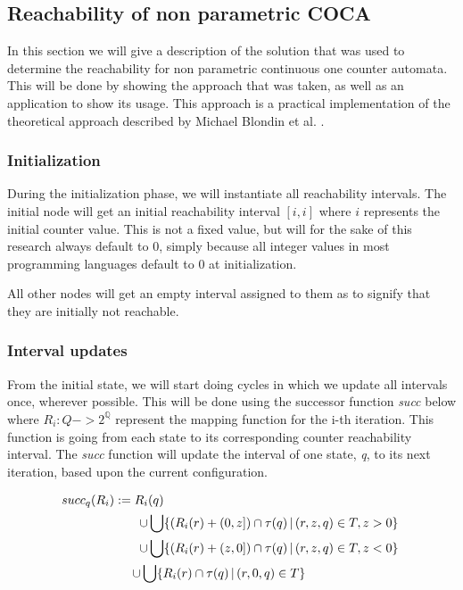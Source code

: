\documentclass[12pt]{article}
\begin{document}
\subsection{Reachability of non parametric COCA}
In this section we will give a description of the solution that was used to determine the reachability for non parametric continuous one counter automata. This will be done by showing the approach that was taken, as well as an application to show its usage. This approach is a practical implementation of the theoretical approach described by Michael Blondin et al. \cite{blondin2021continuous}.

\subsubsection{Initialization}
During the initialization phase, we will instantiate all reachability intervals. The initial node will get an initial reachability interval $[i, i]$ where $i$ represents the initial counter value. This is not a fixed value, but will for the sake of this research always default to 0, simply because all integer values in most programming languages default to 0 at initialization.

All other nodes will get an empty interval assigned to them as to signify that they are initially not reachable.

\subsubsection{Interval updates}
From the initial state, we will start doing cycles in which we update all intervals once, wherever possible. This will be done using the successor function \textit{succ} below where $R_i: Q -> 2^\mathbb{Q}$ represent the mapping function for the i-th iteration. This function is going from each state to its corresponding counter reachability interval. The \textit{succ} function will update the interval of one state, \textit{q}, to its next iteration, based upon the current configuration.

\begin{gather*}
	\hspace{-190 pt} succ_q(R_i) := R_i(q)\\
	\hspace{60 pt} \cup \bigcup \{(R_i(r) + (0, z]) \cap \tau(q)\,|\,(r,z,q) \in T, z>0\}\\
	\hspace{60 pt} \cup \bigcup \{(R_i(r) + (z, 0]) \cap \tau(q)\,|\,(r,z,q) \in T, z<0\}\\
	\hspace{-20 pt} \cup \bigcup \{R_i(r) \cap \tau(q)\,|\,(r,0,q) \in T\}
\end{gather*}
\end{document}
